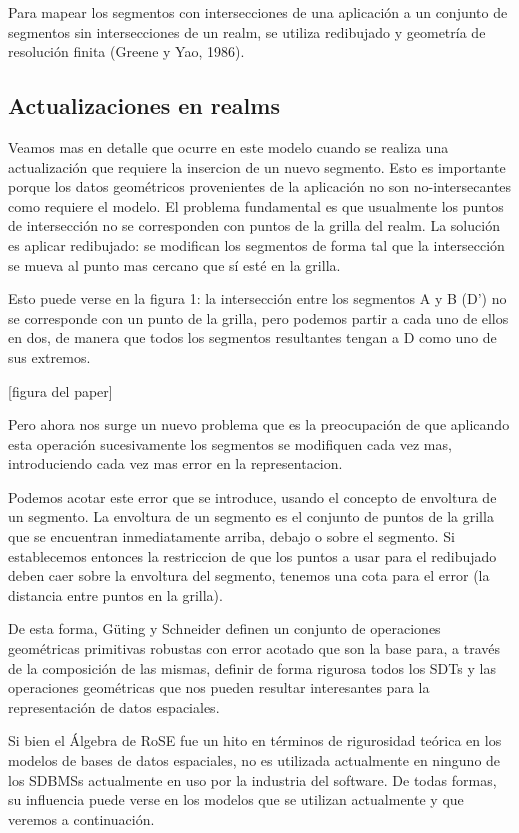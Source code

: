 Para mapear los segmentos con intersecciones de una aplicación a un conjunto de segmentos sin intersecciones de un realm, se utiliza redibujado y geometría de resolución finita (Greene y Yao, 1986).

\subsection{Actualizaciones en realms}

Veamos mas en detalle que ocurre en este modelo cuando se realiza una actualización que requiere la insercion de un nuevo segmento. Esto es importante porque los datos geométricos provenientes de la aplicación no son no-intersecantes como requiere el modelo. El problema fundamental es que usualmente los puntos de intersección no se corresponden con puntos de la grilla del realm. La solución es aplicar redibujado: se modifican los segmentos de forma tal que la intersección se mueva al punto mas cercano que sí esté en la grilla.

Esto puede verse en la figura 1: la intersección entre los segmentos A y B (D') no se corresponde con un punto de la grilla, pero podemos partir a cada uno de ellos en dos, de manera que todos los segmentos resultantes tengan a D como uno de sus extremos.

[figura del paper]

Pero ahora nos surge un nuevo problema que es la preocupación de que aplicando esta operación sucesivamente los segmentos se modifiquen cada vez mas, introduciendo cada vez mas error en la representacion.

Podemos acotar este error que se introduce, usando el concepto de envoltura de un segmento. La envoltura de un segmento es el conjunto de puntos de la grilla que se encuentran inmediatamente arriba, debajo o sobre el segmento. Si establecemos entonces la restriccion de que los puntos a usar para el redibujado deben caer sobre la envoltura del segmento, tenemos una cota para el error (la distancia entre puntos en la grilla).

De esta forma, Güting y Schneider definen un conjunto de operaciones geométricas primitivas robustas con error acotado que son la base para, a través de la composición de las mismas, definir de forma rigurosa todos los SDTs y las operaciones geométricas que nos pueden resultar interesantes para la representación de datos espaciales.

Si bien el Álgebra de RoSE fue un hito en términos de rigurosidad teórica en los modelos de bases de datos espaciales, no es utilizada actualmente en ninguno de los SDBMSs actualmente en uso por la industria del software. De todas formas, su influencia puede verse en los modelos que se utilizan actualmente y que veremos a continuación.

